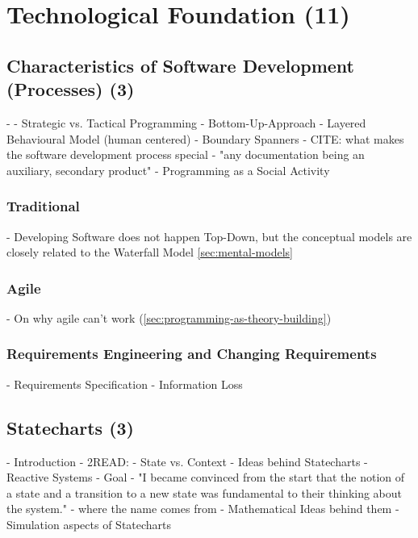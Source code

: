 \chapter{Technological Foundation (11)}

\section{Characteristics of Software Development (Processes) (3)}
- \autocite{mayr_projekt_2005}
- Strategic vs. Tactical Programming \autocite[13--18]{ousterhout_philosophy_2018}
- Bottom-Up-Approach \autocite[17]{horrocks_constructing_1999}
- Layered Behavioural Model (human centered) \autocite[254]{curtis_psychology_1990}
- Boundary Spanners \autocite[264]{curtis_psychology_1990}
- CITE: what makes the software development process special \autocite[274]{kitchenham_research_1990}
- "any documentation being an auxiliary, secondary product" \autocite{naur_programming_1985}
- Programming as a Social Activity \autocite{weinberg_psychology_1971}
\subsection{Traditional}
- Developing Software does not happen Top-Down, but the conceptual models are closely related to the Waterfall Model \ref{sec:mental-models} \autocite[275]{kitchenham_research_1990}
\subsection{Agile}
- On why agile can't work (\ref{sec:programming-as-theory-building}) \autocite[232--233]{naur_programming_1985}
\subsection{Requirements Engineering and Changing Requirements}
- Requirements Specification \autocite[32]{leveson_experiences_1991}
- Information Loss \autocite[265]{curtis_psychology_1990}

\section{Statecharts (3)}
- Introduction \autocite[49]{horrocks_constructing_1999}
- 2READ: \autocite{harel_statecharts:_1987}
- State vs. Context \autocite[36]{leveson_experiences_1991}
- Ideas behind Statecharts \autocite[1]{harel_statecharts_2007}
- Reactive Systems \autocite[2]{harel_statecharts_2007}
- Goal \autocite[3]{harel_statecharts_2007}
- "I became convinced from the start that the notion of a state and a transition to a new state was fundamental to their thinking about the system." \autocite[4]{harel_statecharts_2007}
- where the name comes from \autocite[4]{harel_statecharts_2007}
- Mathematical Ideas behind them \autocite[6]{harel_statecharts_2007}
- Simulation aspects of Statecharts \autocite[7]{harel_statecharts_2007}
